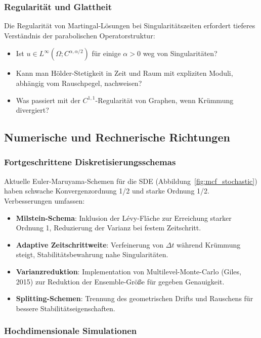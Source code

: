 \documentclass[a4paper,12pt]{article}
\theoremstyle{definition}
\begin{document}
\subsubsection{Regularität und Glattheit}

Die Regularität von Martingal-Lösungen bei Singularitätszeiten erfordert tieferes Verständnis der parabolischen Operatorstruktur:

\begin{itemize}
	\item Ist $u \in L^\infty(\Omega; C^{\alpha,\alpha/2})$ für einige $\alpha > 0$ weg von Singularitäten?
	\item Kann man Hölder-Stetigkeit in Zeit und Raum mit expliziten Moduli, abhängig vom Rauschpegel, nachweisen?
	\item Was passiert mit der $C^{1,1}$-Regularität von Graphen, wenn Krümmung divergiert?
\end{itemize}

\subsection{Numerische und Rechnerische Richtungen}

\subsubsection{Fortgeschrittene Diskretisierungsschemas}

Aktuelle Euler-Maruyama-Schemen für die SDE (Abbildung~\ref{fig:mcf_stochastic}) haben schwache Konvergenzordnung 1/2 und starke Ordnung 1/2. Verbesserungen umfassen:

\begin{itemize}
	\item \textbf{Milstein-Schema}: Inklusion der Lévy-Fläche zur Erreichung starker Ordnung 1, Reduzierung der Varianz bei festem Zeitschritt.
	\item \textbf{Adaptive Zeitschrittweite}: Verfeinerung von $\Delta t$ während Krümmung steigt, Stabilitätsbewahrung nahe Singularitäten.
	\item \textbf{Varianzreduktion}: Implementation von Multilevel-Monte-Carlo (Giles, 2015) zur Reduktion der Ensemble-Größe für gegeben Genauigkeit.
	\item \textbf{Splitting-Schemen}: Trennung des geometrischen Drifts und Rauschens für bessere Stabilitätseigenschaften.
\end{itemize}

\subsubsection{Hochdimensionale Simulationen}
\end{document}
